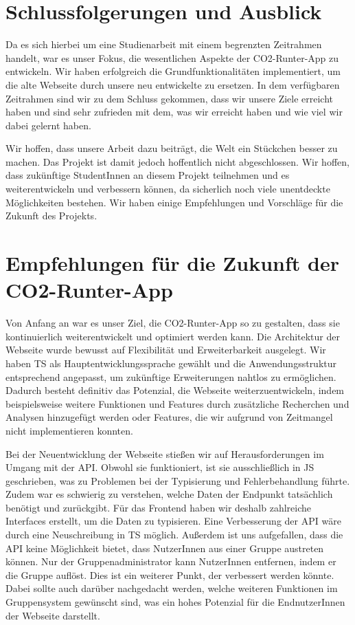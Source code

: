 \section{Schlussfolgerungen und Ausblick}

Da es sich hierbei um eine Studienarbeit mit einem begrenzten Zeitrahmen handelt, war es unser Fokus, die wesentlichen Aspekte der CO2-Runter-App zu entwickeln. Wir haben erfolgreich die Grundfunktionalitäten implementiert, um die alte Webseite durch unsere neu entwickelte zu ersetzen. In dem verfügbaren Zeitrahmen sind wir zu dem Schluss gekommen, dass wir unsere Ziele erreicht haben und sind sehr zufrieden mit dem, was wir erreicht haben und wie viel wir dabei gelernt haben.

Wir hoffen, dass unsere Arbeit dazu beiträgt, die Welt ein Stückchen besser zu machen. Das Projekt ist damit jedoch hoffentlich nicht abgeschlossen. Wir hoffen, dass zukünftige StudentInnen an diesem Projekt teilnehmen und es weiterentwickeln und verbessern können, da sicherlich noch viele unentdeckte Möglichkeiten bestehen. Wir haben einige Empfehlungen und Vorschläge für die Zukunft des Projekts.

\section{Empfehlungen für die Zukunft der CO2-Runter-App}

Von Anfang an war es unser Ziel, die CO2-Runter-App so zu gestalten, dass sie kontinuierlich weiterentwickelt und optimiert werden kann. Die Architektur der Webseite wurde bewusst auf Flexibilität und Erweiterbarkeit ausgelegt. Wir haben \acl{TS} als Hauptentwicklungssprache gewählt und die Anwendungsstruktur entsprechend angepasst, um zukünftige Erweiterungen nahtlos zu ermöglichen. Dadurch besteht definitiv das Potenzial, die Webseite weiterzuentwickeln, indem beispielsweise weitere Funktionen und Features durch zusätzliche Recherchen und Analysen hinzugefügt werden oder Features, die wir aufgrund von Zeitmangel nicht implementieren konnten.

Bei der Neuentwicklung der Webseite stießen wir auf Herausforderungen im Umgang mit der \acs{API}. Obwohl sie funktioniert, ist sie ausschließlich in \acl{JS} geschrieben, was zu Problemen bei der Typisierung und Fehlerbehandlung führte. Zudem war es schwierig zu verstehen, welche Daten der Endpunkt tatsächlich benötigt und zurückgibt. Für das Frontend haben wir deshalb zahlreiche Interfaces erstellt, um die Daten zu typisieren. Eine Verbesserung der \acs{API} wäre durch eine Neuschreibung in \acl{TS} möglich. Außerdem ist uns aufgefallen, dass die \acs{API} keine Möglichkeit bietet, dass NutzerInnen aus einer Gruppe austreten können. Nur der Gruppenadministrator kann NutzerInnen entfernen, indem er die Gruppe auflöst. Dies ist ein weiterer Punkt, der verbessert werden könnte. Dabei sollte auch darüber nachgedacht werden, welche weiteren Funktionen im Gruppensystem gewünscht sind, was ein hohes Potenzial für die EndnutzerInnen der Webseite darstellt.

